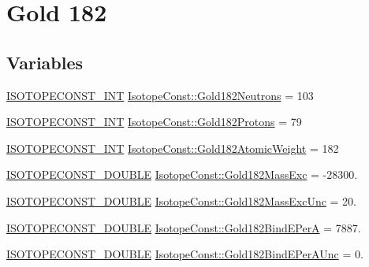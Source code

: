 \hypertarget{group___isotope_const-_gold-_au182}{}\section{Gold 182}
\label{group___isotope_const-_gold-_au182}
\subsection*{Variables}
\begin{DoxyCompactItemize}
\item 
\mbox{\hyperlink{group___isotope_const-_macros_ga5f18360b3e99483a35c32d789e62621c}{I\+S\+O\+T\+O\+P\+E\+C\+O\+N\+S\+T\+\_\+\+I\+NT}} \mbox{\hyperlink{group___isotope_const-_gold-_au182_ga03509b624bb0a13622eec5938eb295ea}{Isotope\+Const\+::\+Gold182\+Neutrons}} = 103
\item 
\mbox{\hyperlink{group___isotope_const-_macros_ga5f18360b3e99483a35c32d789e62621c}{I\+S\+O\+T\+O\+P\+E\+C\+O\+N\+S\+T\+\_\+\+I\+NT}} \mbox{\hyperlink{group___isotope_const-_gold-_au182_ga2bd9c005e8c7efbb8f420dd1db6f9f98}{Isotope\+Const\+::\+Gold182\+Protons}} = 79
\item 
\mbox{\hyperlink{group___isotope_const-_macros_ga5f18360b3e99483a35c32d789e62621c}{I\+S\+O\+T\+O\+P\+E\+C\+O\+N\+S\+T\+\_\+\+I\+NT}} \mbox{\hyperlink{group___isotope_const-_gold-_au182_ga942e20968891ea2842021d5ec5ab4843}{Isotope\+Const\+::\+Gold182\+Atomic\+Weight}} = 182
\item 
\mbox{\hyperlink{group___isotope_const-_macros_ga8f45a7272ce02c0b4c65c44636ed719a}{I\+S\+O\+T\+O\+P\+E\+C\+O\+N\+S\+T\+\_\+\+D\+O\+U\+B\+LE}} \mbox{\hyperlink{group___isotope_const-_gold-_au182_ga11e42da450b82f17abd5ace290b9447c}{Isotope\+Const\+::\+Gold182\+Mass\+Exc}} = -\/28300.
\item 
\mbox{\hyperlink{group___isotope_const-_macros_ga8f45a7272ce02c0b4c65c44636ed719a}{I\+S\+O\+T\+O\+P\+E\+C\+O\+N\+S\+T\+\_\+\+D\+O\+U\+B\+LE}} \mbox{\hyperlink{group___isotope_const-_gold-_au182_ga40cdf237288eabd8563372ff43f05308}{Isotope\+Const\+::\+Gold182\+Mass\+Exc\+Unc}} = 20.
\item 
\mbox{\hyperlink{group___isotope_const-_macros_ga8f45a7272ce02c0b4c65c44636ed719a}{I\+S\+O\+T\+O\+P\+E\+C\+O\+N\+S\+T\+\_\+\+D\+O\+U\+B\+LE}} \mbox{\hyperlink{group___isotope_const-_gold-_au182_ga1fcff48a376034dd3707259dd27b9574}{Isotope\+Const\+::\+Gold182\+Bind\+E\+PerA}} = 7887.
\item 
\mbox{\hyperlink{group___isotope_const-_macros_ga8f45a7272ce02c0b4c65c44636ed719a}{I\+S\+O\+T\+O\+P\+E\+C\+O\+N\+S\+T\+\_\+\+D\+O\+U\+B\+LE}} \mbox{\hyperlink{group___isotope_const-_gold-_au182_ga2e5e469e697bce3b699dc24f8f090c43}{Isotope\+Const\+::\+Gold182\+Bind\+E\+Per\+A\+Unc}} = 0.

\end{DoxyCompactItemize}
